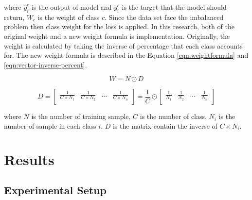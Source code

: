 \documentclass[sensors,article,submit,pdftex,moreauthors]{Definitions/mdpi}
\begin{document}
where $\hat{y}^c_i$  is the output of model and $y^c_i$ is the target that the model should return, $W_c$ is the weight of class $c$. Since the data set face the imbalanced problem then class weight for the loss is applied. In this research, both of the original weight and a new weight formula is implementation. Originally, the weight is calculated by taking the inverse of percentage that each class accounts for. The new weight formula is described in the Equation \ref{eqn:weightformula} and \ref{eqn:vector-inverse-percent}. 

\begin{equation}
	\label{eqn:weightformula}
	W = N \odot D
\end{equation}

\begin{equation}
	\label{eqn:vector-inverse-percent}
	D = \begin{bmatrix}
		\frac{1}{C \times  N_1} & \frac{1}{C \times  N_2} & \dots & \frac{1}{C \times  N_n}\\
	\end{bmatrix} = \frac{1}{C} \odot \begin{bmatrix}
		\frac{1}{N_1} & \frac{1}{N_2} & \dots & \frac{1}{N_n}\\
	\end{bmatrix}
\end{equation}

where $N$ is the number of training sample, $C$ is the number of class, $N_i$ is the number of sample in each class $i$. $D$ is the matrix contain the inverse of $C \times N_i$. 

\section{Results}
\subsection{Experimental Setup}
\end{document}
